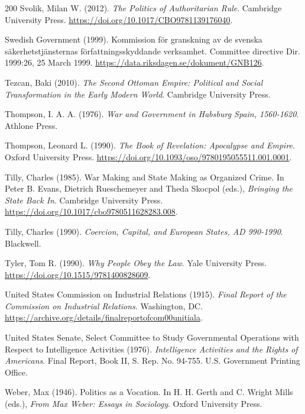 \documentclass[11pt,letterpaper]{article}
\theoremstyle{definition}
\theoremstyle{remark}
\begin{document}
\begin{thebibliography}{200}
Svolik, Milan W. (2012). \emph{The Politics of Authoritarian Rule}. Cambridge University Press. \url{https://doi.org/10.1017/CBO9781139176040}.

 Swedish Government (1999). Kommission f\"or granskning av de svenska s\"akerhetstj\"ansternas f\"orfattningsskyddande verksamhet. Committee directive Dir. 1999:26, 25 March 1999. \url{https://data.riksdagen.se/dokument/GNB126}.

Tezcan, Baki (2010). \emph{The Second Ottoman Empire: Political and Social Transformation in the Early Modern World}. Cambridge University Press.

Thompson, I. A. A. (1976). \emph{War and Government in Habsburg Spain, 1560-1620}. Athlone Press.

Thompson, Leonard L. (1990). \emph{The Book of Revelation: Apocalypse and Empire}. Oxford University Press. \url{https://doi.org/10.1093/oso/9780195055511.001.0001}.

Tilly, Charles (1985). War Making and State Making as Organized Crime. In Peter B. Evans, Dietrich Rueschemeyer and Theda Skocpol (eds.), \emph{Bringing the State Back In}. Cambridge University Press. \url{https://doi.org/10.1017/cbo9780511628283.008}.

Tilly, Charles (1990). \emph{Coercion, Capital, and European States, AD 990-1990}. Blackwell.

Tyler, Tom R. (1990). \emph{Why People Obey the Law}. Yale University Press. \url{https://doi.org/10.1515/9781400828609}.

 United States Commission on Industrial Relations (1915). \emph{Final Report of the Commission on Industrial Relations}. Washington, DC. \url{https://archive.org/details/finalreportofcom00unitiala}.

 United States Senate, Select Committee to Study Governmental Operations with Respect to Intelligence Activities (1976). \emph{Intelligence Activities and the Rights of Americans}. Final Report, Book II, S. Rep. No. 94-755. U.S. Government Printing Office.

Weber, Max (1946). Politics as a Vocation. In H. H. Gerth and C. Wright Mills (eds.), \emph{From Max Weber: Essays in Sociology}. Oxford University Press.


\end{thebibliography}
\end{document}
